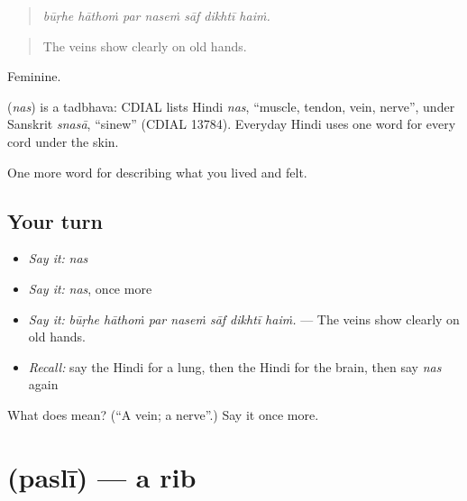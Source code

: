 \begin{quote}
      
\end{quote}

\begin{quote}
\emph{būṛhe hāthoṁ par naseṁ sāf dikhtī haiṁ.}
\end{quote}

\begin{quote}
The veins show clearly on old hands.
\end{quote}

Feminine.

\begin{cousinweb}
\textbf{} (\emph{nas}) is a tadbhava: CDIAL lists Hindi \emph{nas}, \textquotedblleft{}muscle, tendon, vein, nerve\textquotedblright{}, under Sanskrit \emph{snasā}, \textquotedblleft{}sinew\textquotedblright{} (CDIAL 13784). Everyday Hindi uses one word for every cord under the skin.
\end{cousinweb}

\begin{grammarlens}[title={What you've built}]
One more word for describing what you lived and felt.
\end{grammarlens}

\subsection*{Your turn}
\begin{itemize}
\raggedright
  \item \emph{Say it:} \emph{nas}
  \item \emph{Say it:} \emph{nas}, once more
  \item \emph{Say it:} \emph{būṛhe hāthoṁ par naseṁ sāf dikhtī haiṁ.} — The veins show clearly on old hands.
  \item \emph{Recall:} say the Hindi for a lung, then the Hindi for the brain, then say \emph{nas} again
\end{itemize}

\begin{tcolorbox}[breakable,colback=teal!4,colframe=teal!35!black,title={Before you move on}]
What does  mean? (\textquotedblleft{}A vein; a nerve\textquotedblright{}.) Say it once more.
\end{tcolorbox}
\section[\texorpdfstring{\hi{पसली} (paslī)}{पसली (paslī)}]{ (paslī) — a rib}

